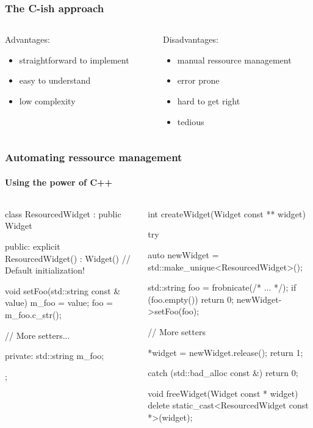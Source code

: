 \documentclass{beamer}
\def\titleinframe#1{{\usebeamercolor[fg]{structure} #1}}
\begin{document}
\begin{frame}[fragile]
\frametitle{The C-ish approach}
\begin{columns}[T]
\begin{column}{0.45\textwidth}
	\titleinframe{Advantages:}
	\begin{itemize}
	\item straightforward to implement
	\item easy to understand
	\item low complexity
	\end{itemize}
\end{column}
\pause
\begin{column}{0.45\textwidth}
	\titleinframe{Disadvantages:}
	\begin{itemize}
	\item manual ressource management
	\item error prone
	\item hard to get right
	\item tedious
	\end{itemize}
\end{column}
\end{columns}
\end{frame}


\begin{frame}[fragile]
\frametitle{Automating ressource management}
\framesubtitle{Using the power of C++}
\begin{columns}
\begin{column}{0.45\textwidth}
\pause
\begin{TinyC++}
class ResourcedWidget : public Widget
{
public:
	explicit ResourcedWidget()
        : Widget()	// Default initialization!
	{}

	void setFoo(std::string const & value)
	{
		m_foo = value;
		foo = m_foo.c_str();
	}

	// More setters...
	
private:
	std::string m_foo;
};
\end{TinyC++}
\end{column}
\pause
\begin{column}{0.45\textwidth}
\begin{TinyC++}
int createWidget(Widget const ** widget)
{
	try	{
		auto newWidget = std::make_unique<ResourcedWidget>();
    
		std::string	foo = frobnicate(/* ... */);
		if (foo.empty())
		{
			return 0;
		}
		newWidget->setFoo(foo);

		// More setters
    
		*widget = newWidget.release();
		return 1;
	}
	catch (std::bad_alloc const &)	{
		return 0;
	}
}
\end{TinyC++}
\pause
\begin{TinyC++}
void freeWidget(Widget const * widget)
{
	delete static_cast<ResourcedWidget const *>(widget);
}
\end{TinyC++}
\end{column}
\end{columns}
\end{frame}
\end{document}

